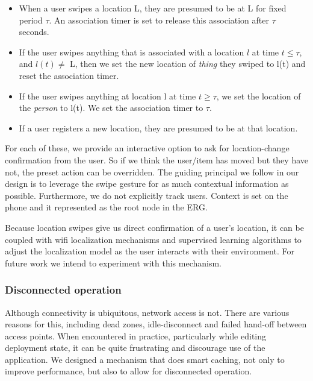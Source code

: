 \begin{itemize}
\item When a user swipes a location L, they are presumed to be at L for fixed period $\tau$.  An association timer is set to 
		release this association after $\tau$ seconds.
\item If the user swipes anything that is associated with a location $l$ at time $t \le \tau$, and $l(t)\ne$ L, 
		then we set the new location of \emph{thing} they swiped to l(t) and reset the association timer.
\item If the user swipes anything at location l at time $t \ge \tau$, we set the location of the \emph{person} to l(t).
		We set the association timer to $\tau$.
\item If a user registers a new location, they are presumed to be at that location.
\end{itemize}
\vspace{0.08in}


For each of these, we provide an interactive option to ask for location-change confirmation from the user.  So if we think the
user/item has moved but they have not, the preset action can be overridden.  The guiding principal we follow in our design
is to leverage the swipe gesture for as much contextual information as possible.  Furthermore, we do not explicitly track users.
Context is set on the phone and it represented as the root node in the ERG.

Because location swipes give us direct confirmation of a user's location, it can be coupled with wifi localization mechanisms
and supervised learning algorithms to adjust the localization model as the user interacts with their environment. 
For future work we intend to experiment with this mechanism.%


\subsubsection{Disconnected operation}
Although connectivity is ubiquitous, network access is not.  There are various reasons for this, including dead zones, 
idle-disconnect and failed hand-off between access points.  When encountered in practice, particularly while editing
deployment state, it can be quite frustrating and discourage use of the application.  We designed a
mechanism that does smart caching, not only to improve performance, but also to allow for disconnected operation.

